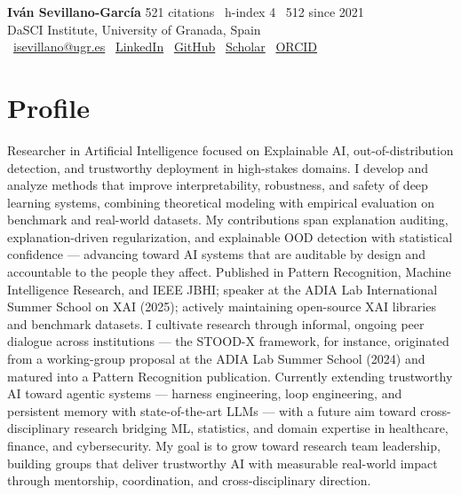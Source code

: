 \documentclass[10pt,a4paper]{article}
\begin{document}
{\Large \textbf{\textcolor{titleblue}{Iván Sevillano-García}}} \hfill {\footnotesize \textcolor{subtle}{521 citations \textbar\ h-index 4 \textbar\ 512 since 2021}} \\[0.1em]
{\footnotesize DaSCI Institute, University of Granada, Spain} \\[0.1em]
{\footnotesize
\faEnvelope\ \href{mailto:isevillano@ugr.es}{isevillano@ugr.es} \quad
\faGlobe\ \href{https://www.linkedin.com/in/iván-sevillano-garcía-304801116}{LinkedIn} \quad
\faGithub\ \href{https://github.com/isega24}{GitHub} \quad
\faGraduationCap\ \href{https://scholar.google.com/citations?user=g5xyauEAAAAJ}{Scholar} \quad
\faOrcid\ \href{https://orcid.org/0000-0002-5029-9106}{ORCID}
}

\vspace{0.2em}

\section*{Profile}

Researcher in Artificial Intelligence focused on Explainable AI, out-of-distribution detection, and trustworthy deployment in high-stakes domains. I develop and analyze methods that improve interpretability, robustness, and safety of deep learning systems, combining theoretical modeling with empirical evaluation on benchmark and real-world datasets. My contributions span explanation auditing, explanation-driven regularization, and explainable OOD detection with statistical confidence --- advancing toward AI systems that are auditable by design and accountable to the people they affect. Published in Pattern Recognition, Machine Intelligence Research, and IEEE JBHI; speaker at the ADIA Lab International Summer School on XAI (2025); actively maintaining open-source XAI libraries and benchmark datasets. I cultivate research through informal, ongoing peer dialogue across institutions --- the STOOD-X framework, for instance, originated from a working-group proposal at the ADIA Lab Summer School (2024) and matured into a Pattern Recognition publication. Currently extending trustworthy AI toward agentic systems --- harness engineering, loop engineering, and persistent memory with state-of-the-art LLMs --- with a future aim toward cross-disciplinary research bridging ML, statistics, and domain expertise in healthcare, finance, and cybersecurity. My goal is to grow toward research team leadership, building groups that deliver trustworthy AI with measurable real-world impact through mentorship, coordination, and cross-disciplinary direction.
\end{document}
